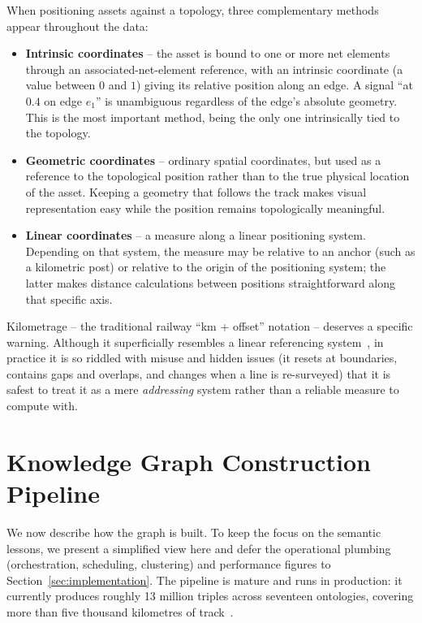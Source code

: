 \documentclass{ceurart}
\begin{document}
When positioning assets against a topology, three complementary methods appear
throughout the data:

\begin{itemize}
  \item \textbf{Intrinsic coordinates} -- the asset is bound to one or more net
        elements through an associated-net-element reference, with an intrinsic
        coordinate (a value between $0$ and $1$) giving its relative position
        along an edge. A signal ``at $0.4$ on edge $e_1$'' is unambiguous
        regardless of the edge's absolute geometry. This is the most important
        method, being the only one intrinsically tied to the topology.
  \item \textbf{Geometric coordinates} -- ordinary spatial coordinates, but used
        as a reference to the topological position rather than to the true
        physical location of the asset. Keeping a geometry that follows the track
        makes visual representation easy while the position remains
        topologically meaningful.
  \item \textbf{Linear coordinates} -- a measure along a linear positioning
        system. Depending on that system, the measure may be relative to an
        anchor (such as a kilometric post) or relative to the origin of the
        positioning system; the latter makes distance calculations between
        positions straightforward along that specific axis.
\end{itemize}

Kilometrage -- the traditional railway ``km + offset'' notation -- deserves a
specific warning. Although it superficially resembles a linear referencing
system~\cite{lrs}, in practice it is so riddled with misuse and hidden issues (it
resets at boundaries, contains gaps and overlaps, and changes when a line is
re-surveyed) that it is safest to treat it as a mere \emph{addressing} system
rather than a reliable measure to compute with.

\section{Knowledge Graph Construction Pipeline}
\label{sec:pipeline}

We now describe how the graph is built. To keep the focus on the semantic
lessons, we present a simplified view here and defer the operational plumbing
(orchestration, scheduling, clustering) and performance figures to
Section~\ref{sec:implementation}. The pipeline is mature and runs in production:
it currently produces roughly 13 million triples across seventeen ontologies,
covering more than five thousand kilometres of track~\cite{dim}.
\end{document}
